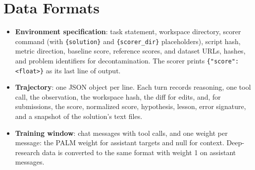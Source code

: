 \documentclass[11pt]{article}
\newcommand{\code}[1]{\texttt{#1}}
\begin{document}
\section{Data Formats}
\label{app:formats}
\begin{itemize}
  \item \textbf{Environment specification}: task statement, workspace directory, scorer command (with \code{\{solution\}} and \code{\{scorer\_dir\}} placeholders), script hash, metric direction, baseline score, reference scores, and dataset URLs, hashes, and problem identifiers for decontamination. The scorer prints \code{\{"score": <float>\}} as its last line of output.
  \item \textbf{Trajectory}: one JSON object per line. Each turn records reasoning, one tool call, the observation, the workspace hash, the diff for edits, and, for submissions, the score, normalized score, hypothesis, lesson, error signature, and a snapshot of the solution's text files.
  \item \textbf{Training window}: chat messages with tool calls, and one weight per message: the PALM weight for assistant targets and null for context. Deep-research data is converted to the same format with weight 1 on assistant messages.
\end{itemize}
\end{document}
